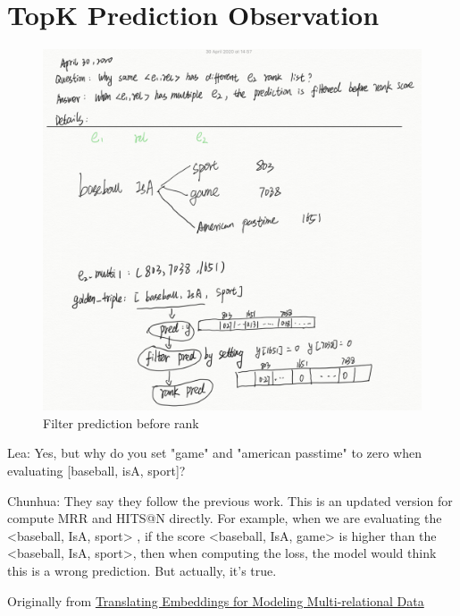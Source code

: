 \section{TopK Prediction Observation}
\begin{figure}[!ht]
    \centering
    \includegraphics[width=\textwidth]{images/filter_prediction.png}
    \caption{Filter prediction before rank}
    \label{fig:my_filter_prediction}
\end{figure}

Lea: 
Yes, but why do you set "game" and "american passtime" to zero when evaluating [baseball, isA, sport]?

Chunhua: 
They say they follow the previous work. This is an updated version for compute MRR and HITS@N directly. For example, when we are evaluating the <baseball, IsA, sport> , if the score <baseball, IsA, game> is higher than the <baseball, IsA, sport>, then when computing the loss, the model would think this is a wrong prediction. But actually, it’s true. 

Originally from \href{https://papers.nips.cc/paper/5071-translating-embeddings-for-modeling-multi-relational-data.pdf}{Translating Embeddings for Modeling Multi-relational Data}


%


